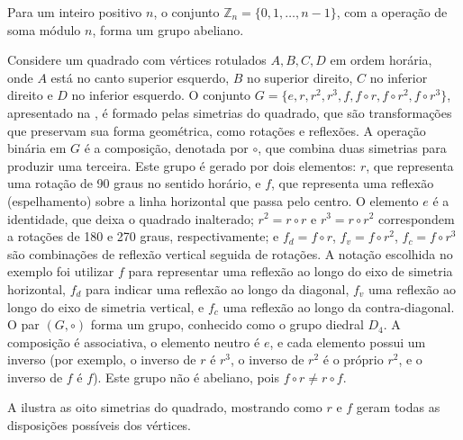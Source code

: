 \begin{example}
Para um inteiro positivo $n$, o conjunto $\mathbb{Z}_n = \{0, 1, \dots, n-1\}$,
com a operação de soma módulo $n$, forma um grupo abeliano.
\end{example}

\begin{example}
Considere um quadrado com vértices rotulados $A, B, C, D$ em ordem horária,
onde $A$ está no canto superior esquerdo, $B$ no superior direito, $C$ no inferior direito e $D$ no inferior esquerdo.
O conjunto $G = \{e, r, r^2, r^3, f, f \circ r, f \circ r^2, f \circ r^3\}$, apresentado na , é formado pelas simetrias do quadrado,
que são transformações que preservam sua forma geométrica, como rotações e reflexões.
A operação binária em $G$ é a composição, denotada por $\circ$, que combina duas simetrias para produzir uma terceira.
Este grupo é gerado por dois elementos: $r$, que representa uma rotação de 90 graus no sentido horário,
e $f$, que representa uma reflexão (espelhamento) sobre a linha horizontal que passa pelo centro.
O elemento $e$ é a identidade, que deixa o quadrado inalterado; $r^2 = r \circ r$ e $r^3 = r \circ r^2$ correspondem a rotações de 180 e 270 graus, respectivamente;
e $f_d = f \circ r$, $f_v = f \circ r^2$, $f_c = f \circ r^3$ são combinações de reflexão vertical seguida de rotações.
A notação escolhida no exemplo foi utilizar $f$ para representar uma reflexão ao longo
do eixo de simetria horizontal, $f_d$ para indicar uma reflexão ao longo da diagonal,
$f_v$ uma reflexão ao longo do eixo de simetria vertical, e $f_c$ uma reflexão ao longo da contra-diagonal.
O par $(G, \circ)$ forma um grupo, conhecido como o grupo diedral $D_4$.
A composição é associativa, o elemento neutro é $e$, e cada elemento possui um inverso 
(por exemplo, o inverso de $r$ é $r^3$, o inverso de $r^2$ é o próprio $r^2$, e o inverso de $f$ é $f$). 
Este grupo não é abeliano, pois $f \circ r \neq r \circ f$.

A  ilustra as oito simetrias do quadrado, mostrando como $r$ e $f$ geram todas as disposições possíveis dos vértices.

\begin{figure}[h]
\centering
\end{figure}
\end{example}
